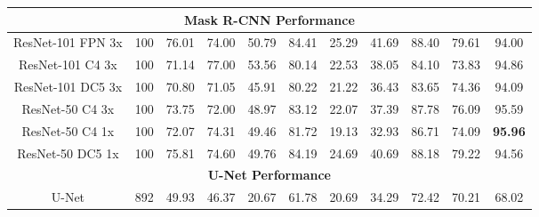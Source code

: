 \documentclass[journal,article,submit,pdftex,moreauthors]{Definitions/mdpi}
\begin{document}
\begin{table}[t]
{\begin{tabular}{|c|c|c|c|c|c|c|c|c|c|c|}
\multicolumn{11}{|c|}{\textbf{Mask R-CNN Performance}} \\ \hline
ResNet-101 FPN 3x & 100 & 76.01 & 74.00 & 50.79 & 84.41 & 25.29 & 41.69 & 88.40 & 79.61 & 94.00 \\ \hline
ResNet-101 C4 3x & 100 & 71.14 & 77.00 & 53.56 & 80.14 & 22.53 & 38.05 & 84.10 & 73.83 & 94.86 \\ \hline
ResNet-101 DC5 3x & 100 & 70.80 & 71.05 & 45.91 & 80.22 & 21.22 & 36.43 & 83.65 & 74.36 & 94.09 \\ \hline
ResNet-50 C4 3x & 100 & 73.75 & 72.00 & 48.97 & 83.12 & 22.07 & 37.39 & 87.78 & 76.09 & 95.59 \\ \hline
ResNet-50 C4 1x & 100 & 72.07 & 74.31 & 49.46 & 81.72 & 19.13 & 32.93 & 86.71 & 74.09 & \textbf{95.96} \\ \hline
ResNet-50 DC5 1x & 100 & 75.81 & 74.60 & 49.76 & 84.19 & 24.69 & 40.69 & 88.18 & 79.22 & 94.56 \\ \hline

\multicolumn{11}{|c|}{\textbf{U-Net Performance}} \\ \hline
U-Net & 892 & 49.93 & 46.37 & 20.67 & 61.78 & 20.69 & 34.29 & 72.42 & 70.21 & 68.02 \\ \hline
\end{tabular}%
}
\end{table}
\end{document}
